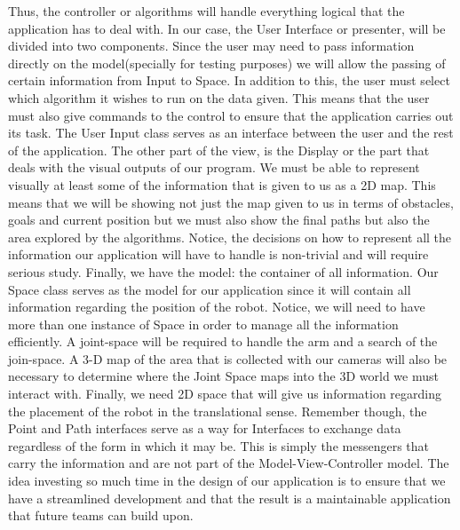 \documentclass[titlepage]{article}
\begin{document}
Thus, the controller or algorithms will handle everything logical that the application has to deal with. In our case, the User Interface or presenter, will be divided into two components. Since the user may need to pass information directly on the model(specially for testing purposes) we will allow the passing of certain information from Input to Space. In addition to this, the user must select which algorithm it wishes to run on the data given. This means that the user must also give commands to the control to ensure that the application carries out its task. The User Input class serves as an interface between the user and the rest of the application.
The other part of the view, is the Display or the part that deals with the visual outputs of our program. We must be able to represent visually at least some of the information that is given to us as a 2D map. This means that we will be showing not just the map given to us in terms of obstacles, goals and current position but we must also show the final paths but also the area explored by the algorithms. Notice, the decisions on how to represent all the information our application will have to handle is non-trivial and will require serious study.
Finally, we have the model: the container of all information. Our Space class serves as the model for our application since it will contain all information regarding the position of the robot. Notice, we will need to have more than one instance of Space in order to manage all the information efficiently. A joint-space will be required to handle the arm and a search of the join-space. A 3-D map of the area that is collected with our cameras will also be necessary to determine where the Joint Space maps into the 3D world we must interact with. Finally, we need 2D space that will give us information regarding the placement of the robot in the translational sense.
Remember though, the Point and Path interfaces serve as a way for Interfaces to exchange data regardless of the form in which it may be. This is simply the messengers that carry the information and are not part of the Model-View-Controller model.
The idea investing so much time in the design of our application is to ensure that we have a streamlined development and that the result is a maintainable application that future teams can build upon.
\end{document}
